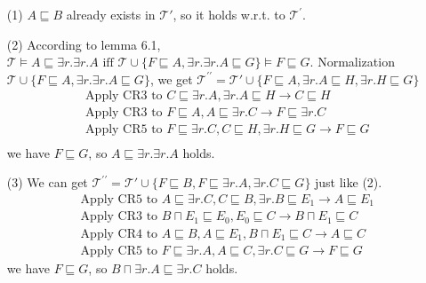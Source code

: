 \documentclass[12pt]{article}
\def \T {\mathcal{T}}
\begin{document}
    \begin{enumerate}
        \item [(1)]
        $A \sqsubseteq B$ already exists in $\T'$, so it holds w.r.t. to $\T^{\prime}$.
        \item [(2)]
        According to lemma 6.1, $\mathcal{T} \models A \sqsubseteq \exists r . \exists r . A \text{ iff }
        \mathcal{T} \cup\{F \sqsubseteq A, \exists r . \exists r . A \sqsubseteq G\} \models F \sqsubseteq G$. Normalization $\mathcal{T} \cup\{F \sqsubseteq A, \exists r . \exists r . A \sqsubseteq G\}$, we get $\T^{\prime\prime} = \T' \cup \{F \sqsubseteq A, \exists r.A \sqsubseteq H, \exists r.H \sqsubseteq G\}$ 
        \begin{align*}
            &\text{ Apply CR3 to } C \sqsubseteq \exists r.A, \exists r.A \sqsubseteq H \rightarrow C \sqsubseteq H \\
            &\text{ Apply CR3 to } F \sqsubseteq A, A \sqsubseteq \exists r.C\rightarrow F \sqsubseteq \exists r.C \\
            &\text{ Apply CR5 to } F \sqsubseteq \exists r.C, C \sqsubseteq H, \exists r.H \sqsubseteq G \rightarrow  F \sqsubseteq G \\
        \end{align*}
    we have $F \sqsubseteq G$, so $A \sqsubseteq \exists r.\exists r.A$ holds.\\
    \item [(3)]
    We can get $\T^{\prime\prime} = \T' \cup \{F \sqsubseteq B, F \sqsubseteq \exists r.A, \exists r.C \sqsubseteq G\}$ just like (2).
    \begin{align*}
        &\text{ Apply CR5 to } A \sqsubseteq \exists r.C, C \sqsubseteq B, \exists r.B \sqsubseteq E_1 \rightarrow A \sqsubseteq E_1 \\
        &\text{ Apply CR3 to } B \sqcap E_1 \sqsubseteq E_0, E_0 \sqsubseteq C \rightarrow B \sqcap E_1 \sqsubseteq C \\
        &\text{ Apply CR4 to } A \sqsubseteq B, A \sqsubseteq E_1, B \sqcap E_1 \sqsubseteq C \rightarrow  A \sqsubseteq C \\
        &\text{ Apply CR5 to } F \sqsubseteq \exists r.A, A \sqsubseteq C, \exists r.C \sqsubseteq G \rightarrow F \sqsubseteq G 
    \end{align*}
    we have $F \sqsubseteq G$, so $B \sqcap \exists r.A \sqsubseteq \exists r.C$ holds.\\
    \end{enumerate}
\end{document}
